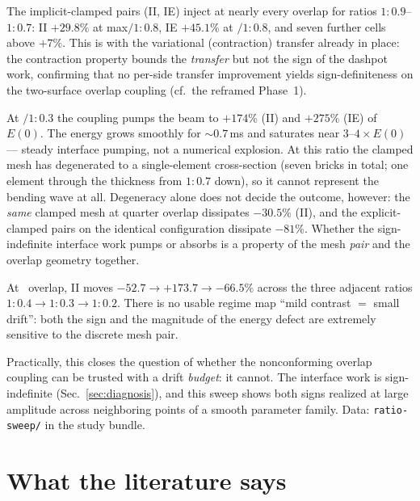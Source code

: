 \documentclass[11pt]{article}
\newcommand{\code}[1]{\texttt{#1}}
\begin{document}
\begin{description}[style=unboxed,leftmargin=0pt,itemsep=2pt]
  \item[Injection at mild coarsening is systematic, not exceptional.] The
  implicit-clamped pairs (II, IE) inject at nearly every overlap for ratios
  $1{:}0.9$--$1{:}0.7$: II $+29.8\%$ at max$/1{:}0.8$, IE $+45.1\%$ at
  \textonehalf$/1{:}0.8$, and seven further cells above $+7\%$. This is with
  the variational (contraction) transfer already in place: the contraction
  property bounds the \emph{transfer} but not the sign of the dashpot work,
  confirming that no per-side transfer improvement yields sign-definiteness on
  the two-surface overlap coupling (cf.\ the reframed Phase~1).
  \item[A violent injection resonance.] At \textonehalf$/1{:}0.3$ the coupling
  pumps the beam to $+174\%$ (II) and $+275\%$ (IE) of $E(0)$. The energy
  grows smoothly for ${\sim}0.7$\,ms and saturates near $3$--$4\times E(0)$
  --- steady interface pumping, not a numerical explosion. At this ratio the
  clamped mesh has degenerated to a single-element cross-section (seven
  bricks in total; one element through the thickness from $1{:}0.7$ down), so
  it cannot represent the bending wave at all. Degeneracy alone does not
  decide the outcome, however: the \emph{same} clamped mesh at quarter
  overlap dissipates $-30.5\%$ (II), and the explicit-clamped pairs on the
  identical configuration dissipate $-81\%$. Whether the sign-indefinite
  interface work pumps or absorbs is a property of the mesh \emph{pair} and
  the overlap geometry together.
  \item[The drift is violently non-monotone in the ratio.] At \textonehalf\
  overlap, II moves $-52.7 \to +173.7 \to -66.5\%$ across the three adjacent
  ratios $1{:}0.4 \to 1{:}0.3 \to 1{:}0.2$. There is no usable regime map
  ``mild contrast $=$ small drift'': both the sign and the magnitude of the
  energy defect are extremely sensitive to the discrete mesh pair.
\end{description}

Practically, this closes the question of whether the nonconforming overlap
coupling can be trusted with a drift \emph{budget}: it cannot. The interface
work is sign-indefinite (Sec.~\ref{sec:diagnosis}), and this sweep shows both
signs realized at large amplitude across neighboring points of a smooth
parameter family. Data: \code{ratio-sweep/} in the study bundle.

\section{What the literature says}
\label{sec:theory}
\end{document}
